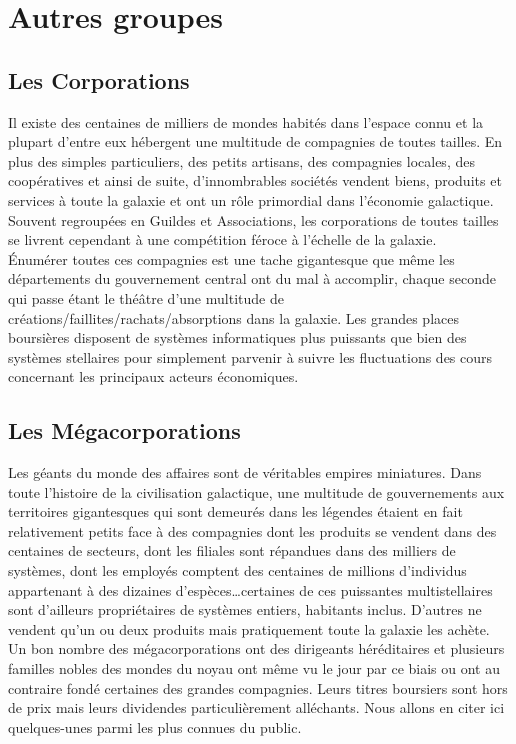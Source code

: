\documentclass[twoside]{article}
\begin{document}
\section{Autres groupes}
\subsection{Les Corporations}
Il existe des centaines de milliers de mondes habités dans l'espace connu et la plupart d'entre eux hébergent une multitude de compagnies de toutes tailles. En plus des simples particuliers, des petits artisans, des compagnies locales, des coopératives et ainsi de suite, d'innombrables sociétés vendent biens, produits et services à toute la galaxie et ont un rôle primordial dans l'économie galactique. Souvent regroupées en Guildes et Associations, les corporations de toutes tailles se livrent cependant à une compétition féroce à l'échelle de la galaxie.\\

Énumérer toutes ces compagnies est une tache gigantesque que même les départements du gouvernement central ont du mal à accomplir, chaque seconde qui passe étant le théâtre d'une multitude de créations/faillites/rachats/absorptions dans la galaxie. Les grandes places boursières disposent de systèmes informatiques plus puissants que bien des systèmes stellaires pour simplement parvenir à suivre les fluctuations des cours concernant les principaux acteurs économiques.

\subsection{Les Mégacorporations}
Les géants du monde des affaires sont de véritables empires miniatures. Dans toute l'histoire de la civilisation galactique, une multitude de gouvernements aux territoires gigantesques qui sont demeurés dans les légendes étaient en fait relativement petits face à des compagnies dont les produits se vendent dans des centaines de secteurs, dont les filiales sont répandues dans des milliers de systèmes, dont les employés comptent des centaines de millions d'individus appartenant à des dizaines d'espèces\ldots certaines de ces puissantes multistellaires sont d'ailleurs propriétaires de systèmes entiers, habitants inclus. D'autres ne vendent qu'un ou deux produits mais pratiquement toute la galaxie les achète.\\

Un bon nombre des mégacorporations ont des dirigeants héréditaires et plusieurs familles nobles des mondes du noyau ont même vu le jour par ce biais ou ont au contraire fondé certaines des grandes compagnies. Leurs titres boursiers sont hors de prix mais leurs dividendes particulièrement alléchants. Nous allons en citer ici quelques-unes parmi les plus connues du public.
\end{document}
